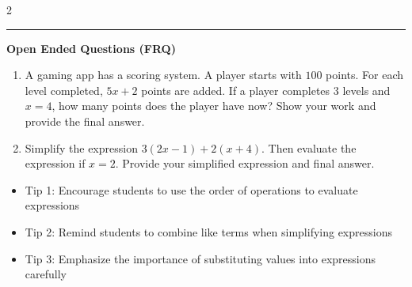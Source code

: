 \documentclass[10pt]{article}
\begin{document}
\begin{multicols}{2}
\begin{enumerate}[label=\textbf{Q\arabic*.}, leftmargin=*, itemsep=6pt, parsep=0pt]
\end{enumerate}
\end{multicols}

\vspace{-0.2cm}
\hrule
\vspace{0.2cm}
\textbf{\small Open Ended Questions (FRQ)}
\begin{enumerate}[label=\textbf{Q\arabic*.}, start=9, itemsep=5pt, topsep=0pt]

  \item \small A gaming app has a scoring system. A player starts with $100$ points. For each level completed, $5x + 2$ points are added. If a player completes $3$ levels and $x = 4$, how many points does the player have now? Show your work and provide the final answer. \vspace{2cm}

  \item \small Simplify the expression $3(2x - 1) + 2(x + 4)$. Then evaluate the expression if $x = 2$. Provide your simplified expression and final answer. \vspace{2cm}

\end{enumerate}

\vfill

\begin{tcolorbox}[colback=blue!5, colframe=mainblue!50, title=\small \textbf{Chef's Tips}, fonttitle=\bfseries, bottom=1mm]
\begin{itemize}[noitemsep, topsep=2pt, leftmargin=0.5cm]
  \item \scriptsize Tip 1: Encourage students to use the order of operations to evaluate expressions\item \scriptsize Tip 2: Remind students to combine like terms when simplifying expressions\item \scriptsize Tip 3: Emphasize the importance of substituting values into expressions carefully
\end{itemize}
\end{tcolorbox}
\end{document}
